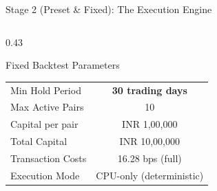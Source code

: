 \documentclass[aspectratio=169,10pt]{beamer}
\begin{document}
\begin{frame}{Stage 2 (Preset \& Fixed): The Execution Engine}
\begin{columns}[T]
\begin{column}{0.43\textwidth}
\begin{block}{Fixed Backtest Parameters}
\begin{tabular}{lc}
          \rowcolor{hlrow} Min Hold Period & \textbf{30 trading days} \\
          Max Active Pairs   & 10 \\
          Capital per pair   & INR 1,00,000 \\
          Total Capital      & INR 10,00,000 \\
          Transaction Costs  & 16.28 bps (full) \\
          Execution Mode     & CPU-only (deterministic) \\
          \bottomrule
        \end{tabular}
      \end{block}
    \end{column}
  \end{columns}
\end{frame}
\end{document}
